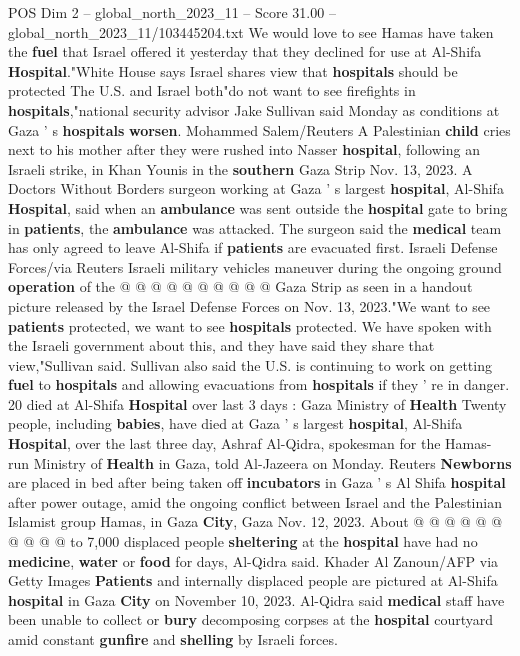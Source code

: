 \begin{textsample}{POS Dim 2 – global\_north\_2023\_11 – Score 31.00 – global\_north\_2023\_11/103445204.txt}
We would love to see Hamas have taken the \textbf{fuel} that Israel offered it yesterday that they declined for use at Al-Shifa \textbf{Hospital}."White House says Israel shares view that \textbf{hospitals} should be protected The U.S. and Israel both"do not want to see firefights in \textbf{hospitals},"national security advisor Jake Sullivan said Monday as conditions at Gaza ' s \textbf{hospitals} \textbf{worsen}.
Mohammed Salem/Reuters A Palestinian \textbf{child} cries next to his mother after they were rushed into Nasser \textbf{hospital}, following an Israeli strike, in Khan Younis in the \textbf{southern} Gaza Strip Nov. 13, 2023.
A Doctors Without Borders surgeon working at Gaza ' s largest \textbf{hospital}, Al-Shifa \textbf{Hospital}, said when an \textbf{ambulance} was sent outside the \textbf{hospital} gate to bring in \textbf{patients}, the \textbf{ambulance} was attacked.
The surgeon said the \textbf{medical} team has only agreed to leave Al-Shifa if \textbf{patients} are evacuated first.
Israeli Defense Forces/via Reuters Israeli military vehicles maneuver during the ongoing ground \textbf{operation} of the @ @ @ @ @ @ @ @ @ @ Gaza Strip as seen in a handout picture released by the Israel Defense Forces on Nov. 13, 2023."We want to see \textbf{patients} protected, we want to see \textbf{hospitals} protected.
We have spoken with the Israeli government about this, and they have said they share that view,"Sullivan said.
Sullivan also said the U.S. is continuing to work on getting \textbf{fuel} to \textbf{hospitals} and allowing evacuations from \textbf{hospitals} if they ' re in danger. 20 died at Al-Shifa \textbf{Hospital} over last 3 days : Gaza Ministry of \textbf{Health} Twenty people, including \textbf{babies}, have died at Gaza ' s largest \textbf{hospital}, Al-Shifa \textbf{Hospital}, over the last three day, Ashraf Al-Qidra, spokesman for the Hamas-run Ministry of \textbf{Health} in Gaza, told Al-Jazeera on Monday.
Reuters \textbf{Newborns} are placed in bed after being taken off \textbf{incubators} in Gaza ' s Al Shifa \textbf{hospital} after power outage, amid the ongoing conflict between Israel and the Palestinian Islamist group Hamas, in Gaza \textbf{City}, Gaza Nov. 12, 2023.
About @ @ @ @ @ @ @ @ @ @ to 7,000 displaced people \textbf{sheltering} at the \textbf{hospital} have had no \textbf{medicine}, \textbf{water} or \textbf{food} for days, Al-Qidra said.
Khader Al Zanoun/AFP via Getty Images \textbf{Patients} and internally displaced people are pictured at Al-Shifa \textbf{hospital} in Gaza \textbf{City} on November 10, 2023.
Al-Qidra said \textbf{medical} staff have been unable to collect or \textbf{bury} decomposing corpses at the \textbf{hospital} courtyard amid constant \textbf{gunfire} and \textbf{shelling} by Israeli forces.

\end{textsample}
